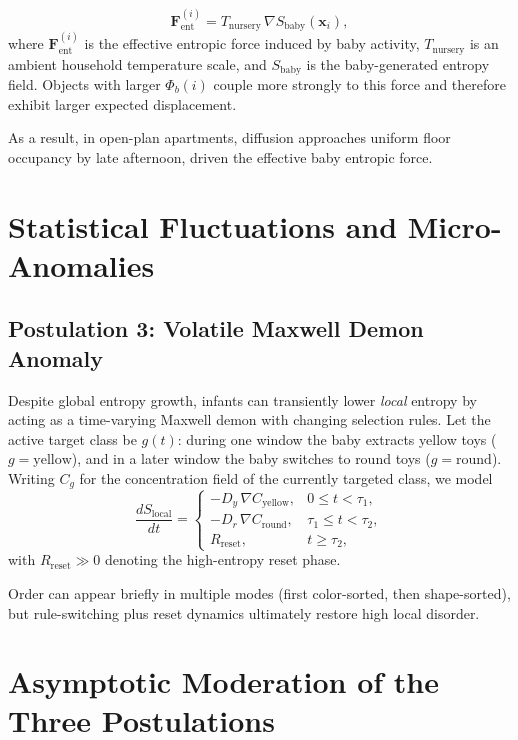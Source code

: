 \documentclass[11pt]{article}
\begin{document}
\begin{equation}
\mathbf{F}_{\mathrm{ent}}^{(i)} = T_{\mathrm{nursery}}\,\nabla S_{\mathrm{baby}}\!\left(\mathbf{x}_i\right),
\end{equation}
where $\mathbf{F}_{\mathrm{ent}}^{(i)}$ is the effective entropic force induced by baby activity, $T_{\mathrm{nursery}}$ is an ambient household temperature scale, and $S_{\mathrm{baby}}$ is the baby-generated entropy field. Objects with larger $\Phi_b(i)$ couple more strongly to this force and therefore exhibit larger expected displacement.

As a result, in open-plan apartments, diffusion approaches uniform floor occupancy by late afternoon, driven the effective baby entropic force.

\section{Statistical Fluctuations and Micro-Anomalies}
\subsection{Postulation 3: Volatile Maxwell Demon Anomaly}
Despite global entropy growth, infants can transiently lower \emph{local} entropy by acting as a time-varying Maxwell demon with changing selection rules. Let the active target class be $g(t)$: during one window the baby extracts yellow toys ($g=\text{yellow}$), and in a later window the baby switches to round toys ($g=\text{round}$). Writing $C_g$ for the concentration field of the currently targeted class, we model
\begin{equation}
\frac{dS_{\text{local}}}{dt}=
\begin{cases}
-D_y\,\nabla C_{\text{yellow}}, & 0\le t<\tau_1,\\[4pt]
-D_r\,\nabla C_{\text{round}}, & \tau_1\le t<\tau_2,\\[4pt]
R_{\text{reset}}, & t\ge \tau_2,
\end{cases}
\end{equation}
with $R_{\text{reset}}\gg 0$ denoting the high-entropy reset phase.

Order can appear briefly in multiple modes (first color-sorted, then shape-sorted), but rule-switching plus reset dynamics ultimately restore high local disorder.

\section{Asymptotic Moderation of the Three Postulations}
\end{document}
